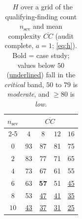 \begin{table}[!tp]
  \centering
  \caption{\phindex\ $H$ over a grid of the qualifying-finding count
           $n_{\text{sev}}$ and mean complexity $\overline{CC}$
           (audit complete, $a=1$; \cref{eq:h}). Bold = case study;
           values below $50$ (\underline{underlined}) fall in the
           \emph{critical} band, $50$ to $79$ is \emph{moderate}, and
           $\ge 80$ is \emph{low}.}
  \label{tab:sensitivity}
  \renewcommand{\arraystretch}{1.3}
  \setlength{\tabcolsep}{20pt}
  \small
  \begin{tabular}{@{}c c c c c@{}}
    \toprule
    \multirow{2}{*}{$n_{\text{sev}}$} &
      \multicolumn{4}{c}{$\overline{CC}$} \\
    \cmidrule(lr){2-5}
     & $4$ & $8$ & $12$ & $16$ \\
    \midrule
    $0$  & 93 & 87 & 81 & 75 \\
    $2$  & 83 & 77 & 71 & 65 \\
    $4$  & 73 & 67 & 61 & 55 \\
    $6$  & 63 & \textbf{57} & 51 & \underline{45} \\
    $8$  & 53 & \underline{47} & \underline{41} & \underline{35} \\
    $10$ & \underline{43} & \underline{37} & \underline{31} & \underline{25} \\
    \bottomrule
  \end{tabular}
\end{table}

